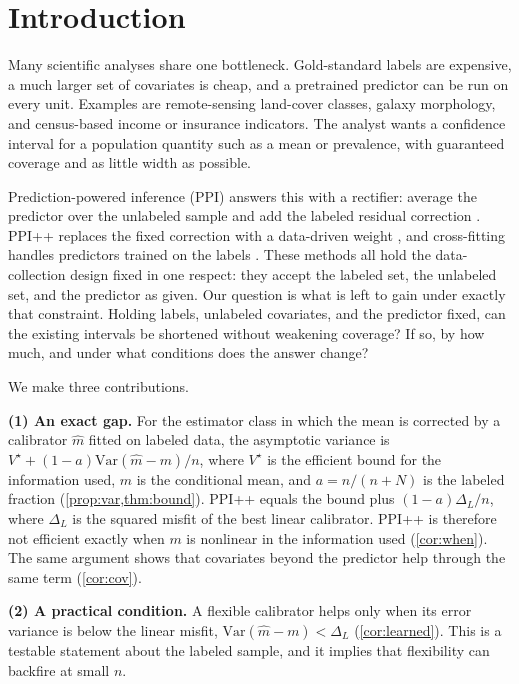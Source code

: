 \section{Introduction}
\label{sec:intro}

Many scientific analyses share one bottleneck. Gold-standard labels are expensive, a much larger set of covariates is cheap, and a pretrained predictor can be run on every unit. Examples are remote-sensing land-cover classes, galaxy morphology, and census-based income or insurance indicators. The analyst wants a confidence interval for a population quantity such as a mean or prevalence, with guaranteed coverage and as little width as possible.

Prediction-powered inference (PPI) answers this with a rectifier: average the predictor over the unlabeled sample and add the labeled residual correction \citep{angelopoulos2023ppi}. PPI++ replaces the fixed correction with a data-driven weight \citep{angelopoulos2023ppiplus}, and cross-fitting handles predictors trained on the labels \citep{zrnic2023cross}. These methods all hold the data-collection design fixed in one respect: they accept the labeled set, the unlabeled set, and the predictor as given. Our question is what is left to gain under exactly that constraint. Holding labels, unlabeled covariates, and the predictor fixed, can the existing intervals be shortened without weakening coverage? If so, by how much, and under what conditions does the answer change?

We make three contributions.

\textbf{(1) An exact gap.} For the estimator class in which the mean is corrected by a calibrator $\hat m$ fitted on labeled data, the asymptotic variance is $V^\star+(1-a)\mathrm{Var}(\hat m-m)/n$, where $V^\star$ is the efficient bound for the information used, $m$ is the conditional mean, and $a=n/(n+N)$ is the labeled fraction (\cref{prop:var,thm:bound}). PPI++ equals the bound plus $(1-a)\Delta_L/n$, where $\Delta_L$ is the squared misfit of the best linear calibrator. PPI++ is therefore not efficient exactly when $m$ is nonlinear in the information used (\cref{cor:when}). The same argument shows that covariates beyond the predictor help through the same term (\cref{cor:cov}).

\textbf{(2) A practical condition.} A flexible calibrator helps only when its error variance is below the linear misfit, $\mathrm{Var}(\hat m-m)<\Delta_L$ (\cref{cor:learned}). This is a testable statement about the labeled sample, and it implies that flexibility can backfire at small $n$.


